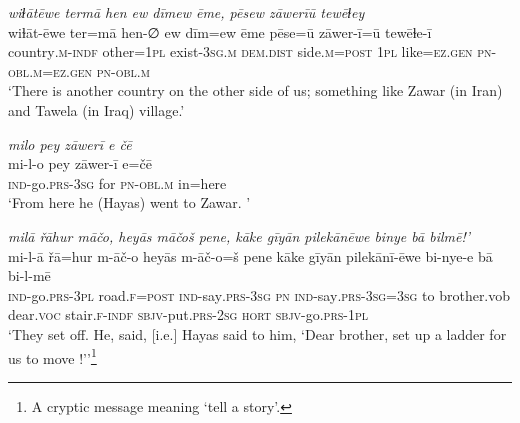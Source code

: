 \ea \label{ŽH.6}
\textit{wiɫātēwe termā hen ew dīmew ēme, pēsew zāwerīū tewēɫey} \\ 
\gll wiɫāt-ēwe ter=mā hen-∅ ew dīm=ew ēme pēse=ū zāwer-ī=ū tewēɫe-ī \\ 
 country\textsc{.m}\textsc{-indf} other\textsc{=1pl} exist\textsc{-3sg}\textsc{.m} \textsc{dem.dist} side\textsc{.m}\textsc{=\textsc{post}} \textsc{1pl} like\textsc{=ez}\textsc{.gen} \textsc{pn}\textsc{-obl}\textsc{.m}\textsc{=ez}\textsc{.gen} \textsc{pn}\textsc{-obl}\textsc{.m} \\ 
\glt `There is another country on the other side of us; something like Zawar (in Iran) and Tawela (in Iraq) village.'
\z 
 
\ea \label{ŽH.7}
\textit{milo pey zāwerī e čē} \\ 
\gll mi-l-o pey zāwer-ī e=čē \\ 
 \textsc{ind-}go\textsc{.prs}\textsc{-3sg} for \textsc{pn}\textsc{-obl}\textsc{.m} in=here \\ 
\glt `From here he (Hayas) went to Zawar. '
\z 
 
\ea \label{ŽH.12}
\textit{milā řāhur māčo, heyās māčoš pene, kāke gīyān pilekānēwe binye bā bilmē!’} \\ 
\gll mi-l-ā řā=hur m-āč-o heyās m-āč-o=š pene kāke gīyān pilekānī-ēwe bi-nye-e bā bi-l-mē \\ 
 \textsc{ind-}go\textsc{.prs}\textsc{-3pl} road\textsc{\textsc{.f}}\textsc{=\textsc{post}} \textsc{ind-}say\textsc{.prs}\textsc{-3sg} \textsc{pn} \textsc{ind-}say\textsc{.prs}\textsc{-3sg}\textsc{=3sg} to brother.vob dear.\textsc{voc} stair\textsc{\textsc{.f}}\textsc{-indf} \textsc{sbjv-}put\textsc{.prs}-\textsc{2sg} \textsc{hort} \textsc{sbjv-}go\textsc{.prs}\textsc{-1pl} \\ 
\glt `They set off. He, said, [i.e.] Hayas said to him, ‘Dear brother, set up a ladder for us to move !’'\footnote{A cryptic message meaning ‘tell a story’.}
\z 
 
